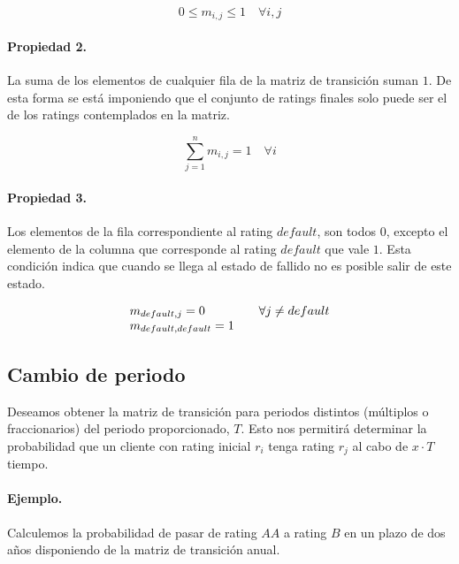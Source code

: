 \begin{displaymath}
0 \leq m_{i,j} \leq 1 \quad \forall i,j
\end{displaymath}

\paragraph{Propiedad 2.}
La suma de los elementos de cualquier fila de la matriz de transición suman $1$.
De esta forma se  está imponiendo que el conjunto de ratings finales solo puede 
ser el de los ratings contemplados en la matriz.

\begin{displaymath}
\sum_{j=1}^{n} m_{i,j} = 1 \quad \forall i
\end{displaymath}

\paragraph{Propiedad 3.}
Los elementos de la fila correspondiente al rating $default$, son todos $0$,
excepto el elemento de la columna que corresponde al rating $default$ que vale 
$1$. Esta condición indica que cuando se llega al estado de fallido no es 
posible salir de este estado.

\begin{displaymath}
\begin{array}{ll}
m_{default,j} = 0        & \quad \forall j \neq default \cr
m_{default,default} = 1
\end{array}
\end{displaymath}


\subsection{Cambio de periodo}

Deseamos obtener la matriz de transición para periodos distintos (múltiplos o 
fraccionarios) del periodo proporcionado, $T$. Esto nos permitirá determinar la 
probabilidad que un cliente con rating inicial $r_i$ tenga rating $r_j$ al cabo 
de $x \cdot T$ tiempo.

\paragraph{Ejemplo.} Calculemos la probabilidad de pasar de rating $AA$ a
rating $B$ en un plazo de dos años disponiendo de la matriz de transición anual.

